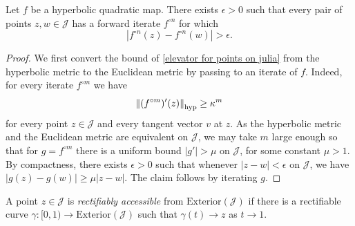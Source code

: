 

\begin{corollary} \label{elevator for points on julia}
	Let $f$ be a hyperbolic quadratic map.
	There exists  $\epsilon > 0$ such that 
	every pair of points $z,w\in\mathcal{J}$
	 has a forward iterate $f^{\circ n}$ for which 
	 \begin{equation*}
		\left|f^{\circ n}(z)-f^{\circ n}(w)\right|>\epsilon.	
	 \end{equation*}
\end{corollary}

\begin{proof}	
	We first convert the bound of \cref{elevator for points on julia} from the hyperbolic metric
	to the Euclidean metric by passing to an iterate of $f$. 
	Indeed, for every iterate $f^{\circ m}$ we have
	\begin{equation}
		\left\Vert (f^{\circ m})'(z)\right\Vert_\mathrm{hyp} \geq \kappa^m
	\end{equation} 
	for every point $z \in \mathcal J$ and every tangent vector $v$ at $z$.
	As the hyperbolic metric and the Euclidean metric are equivalent on $\mathcal J$,
	we may take $m$ large enough so that for $g=f^{\circ m}$ there is a uniform bound
	$|g'| > \mu$ on $\mathcal J$, for some constant $\mu  > 1$. 
	By compactness, there exists $\epsilon>0$ such that whenever $|z-w| < \epsilon$ on $\mathcal J$,
	we have $|g(z)-g(w)| \geq \mu |z-w|$. The claim follows by iterating $g$.
\end{proof}

\begin{definition}
	A point $z \in \mathcal J$ is \emph{rectifiably accessible} from $\mathrm{Exterior}(\mathcal J)$ if there is a rectifiable curve $\gamma: [0,1) \to \mathrm{Exterior}(\mathcal J)$ such that $\gamma (t) \to z$ as $t \to 1$.
\end{definition}

